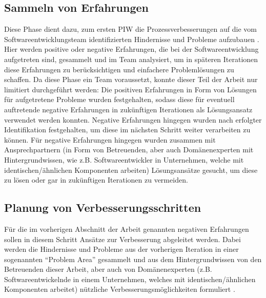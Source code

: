 \subsection{Sammeln von Erfahrungen}
Diese Phase dient dazu, zum ersten PIW die Prozessverbesserungen auf die vom Softwareentwicklungsteam identifizierten Hindernisse und Probleme aufzubauen \cite{salo2007iterative}. Hier werden positive oder negative Erfahrungen, die bei der Softwareentwicklung aufgetreten sind, gesammelt und im Team analysiert, um in späteren Iterationen diese Erfahrungen zu berücksichtigen und einfachere Problemlösungen zu schaffen. Da diese Phase ein Team voraussetzt, konnte dieser Teil der Arbeit nur limitiert durchgeführt werden: Die positiven Erfahrungen in Form von Lösungen für aufgetretene Probleme wurden festgehalten, sodass diese für eventuell auftretende negative Erfahrungen in zukünftigen Iterationen als Lösungsansatz verwendet werden konnten. Negative Erfahrungen hingegen wurden nach erfolgter Identifikation festgehalten, um diese im nächsten Schritt weiter verarbeiten zu können. \newline
Für negative Erfahrungen hingegen wurden zusammen mit Ansprechpartnern (in Form von Betreuenden, aber auch Domänenexperten mit Hintergrundwissen, wie z.B. Softwareentwickler in Unternehmen, welche mit identischen/ähnlichen Komponenten arbeiten) Lösungsansätze gesucht, um diese zu lösen oder gar in zukünftigen Iterationen zu vermeiden.

\subsection{Planung von Verbesserungsschritten}
Für die im vorherigen Abschnitt der Arbeit genannten negativen Erfahrungen sollen in diesem Schritt Ansätze zur Verbesserung abgeleitet werden. Dabei werden die Hindernisse und Probleme aus der vorherigen Iteration in einer sogenannten \enquote{Problem Area} gesammelt und aus dem Hintergrundwissen von den Betreuenden dieser Arbeit, aber auch von Domänenexperten (z.B. Softwareentwickelnde in einem Unternehmen, welches mit identischen/ähnlichen Komponenten arbeitet) nützliche Verbesserungsmöglichkeiten formuliert \cite{salo2007iterative}. 

